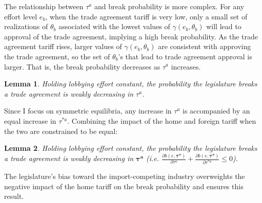 \documentclass[10pt]{article}
\newtheorem{lemma}{Lemma}
\newcommand{\ta}{\theta}
\newcommand{\bta}{\bm{\tau^a}}
\newcommand{\ga}{\gamma}
\begin{document}
The relationship between $\tau^a$ and break probability is more complex. For any effort level $e_b$, when the trade agreement tariff is very low, only a small set of realizations of $\ta_b$ associated with the lowest values of $\ga(e_b,\ta_b)$ will lead to approval of the trade agreement, implying a high break probability. As the trade agreement tariff rises, larger values of $\ga(e_b,\ta_b)$ are consistent with approving the trade agreement, so the set of $\ta_b$'s that lead to trade agreement approval is larger. That is, the break probability decreases as $\tau^a$ increases. 

\begin{lemma}
  Holding lobbying effort constant, the probability the legislature breaks a trade agreement is weakly decreasing in $\tau^a$.
  \label{res:leg_a}
\end{lemma}

Since I focus on symmetric equilibria, any increase in $\tau^a$ is accompanied by an equal increase in $\tau^{*a}$. Combining the impact of the home and foreign tariff when the two are constrained to be equal:
\begin{lemma}
	Holding lobbying effort constant, the probability the legislature breaks a trade agreement is weakly decreasing in $\bta$ (i.e. $\frac{\partial b(e,\bta)}{\partial  \tau^a} + \frac{\partial b(e,\bta)}{\partial  \tau^{*a}} \leq 0$).
	\label{res:bcomb}
\end{lemma}

\noindent The legislature's bias toward the import-competing industry overweights the negative impact of the home tariff on the break probability and ensures this result. 
\end{document}
